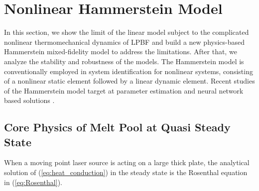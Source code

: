 \documentclass [11pt, proquest] {uwthesis}[2020/02/24]
\begin{document}
\section{\label{sec:HAMMERSTEIN-MODEL-IN}Nonlinear Hammerstein Model}

In this section, we show the limit of the linear model subject to
the complicated nonlinear thermomechanical dynamics of LPBF and build
a new physics-based Hammerstein mixed-fidelity model to address the limitations.
After that, we analyze the stability and robustness of the models.
The Hammerstein model is conventionally employed in system identification
for nonlinear systems, consisting of a nonlinear static element followed
by a linear dynamic element. Recent studies of the Hammerstein model
target at parameter estimation and neural network based solutions
\cite{rayouf2019new,doyle2002identification,ren2011identification}. 

\subsection{\label{subsec:Analytical-Solutions}Core Physics of Melt Pool at
Quasi Steady State}

When a moving point laser source is acting on a large thick plate,
the analytical solution of (\ref{eq:heat_conduction}) in the steady
state is the Rosenthal equation in (\ref{eq:Rosenthal}).
\end{document}
